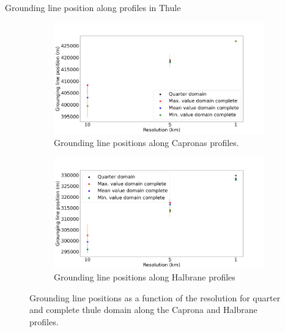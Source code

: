 \documentclass[11pt]{beamer}
\begin{document}
		\begin{frame}{Grounding line position along profiles in Thule}
			\begin{figure}
				\centering
				\begin{subfigure}{.5\textwidth}
					\centering
					\includegraphics[width=1.1\linewidth]{../fig/Figure_THULE_GLpositions_Capronas.png}
					\caption{Grounding line positions along Capronas profiles.}
					\label{Thule_Capronas}
				\end{subfigure}%
				\begin{subfigure}{.5\textwidth}
					\centering
					\includegraphics[width=1.1\linewidth]{../fig/Figure_THULE_GLpositions_Halbranes.png}
					\caption{Grounding line positions along Halbrane profiles}
					\label{Thule_halbranes}
				\end{subfigure}
				\caption{Grounding line positions as a function of the resolution for quarter and complete thule domain along the Caprona and Halbrane profiles.}
				\label{Grounding_lines__caprona_halbrane_comparison}
			\end{figure}
		\end{frame}
\end{document}
